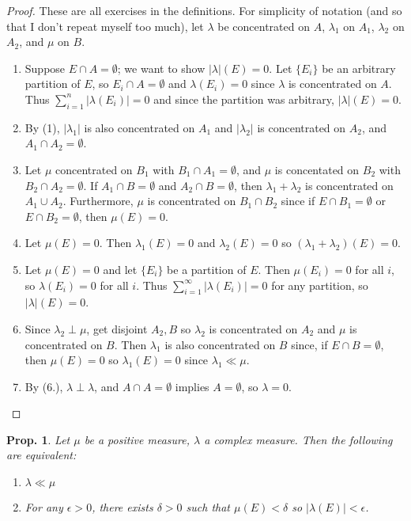 \documentclass[12pt, a4paper]{book}
\newtheorem{proposition}[theorem]{Prop.}
\theoremstyle{nonumberplain}
\newtheorem{proof}{Proof}
\begin{document}
\begin{proof}
    These are all exercises in the definitions.
    For simplicity of notation (and so that I don't repeat myself too much), let $\lambda$ be concentrated on $A$, $\lambda_1$ on $A_1$, $\lambda_2$ on $A_2$, and $\mu$ on $B$.
    \begin{enumerate}[nolistsep]
        \item Suppose $E\cap A=\emptyset$; we want to show $|\lambda|(E)=0$.
            Let $\{E_i\}$ be an arbitrary partition of $E$, so $E_i\cap A=\emptyset$ and $\lambda(E_i)=0$ since $\lambda$ is concentrated on $A$.
            Thus $\sum_{i=1}^n|\lambda(E_i)|=0$ and since the partition was arbitrary, $|\lambda|(E)=0$.
        \item By (1), $|\lambda_1|$ is also concentrated on $A_1$ and $|\lambda_2|$ is concentrated on $A_2$, and $A_1\cap A_2=\emptyset$.
        \item Let $\mu$ concentrated on $B_1$ with $B_1\cap A_1=\emptyset$, and $\mu$ is concentated on $B_2$ with $B_2\cap A_2=\emptyset$.
            If $A_1\cap B=\emptyset$ and $A_2\cap B=\emptyset$, then $\lambda_1+\lambda_2$ is concentrated on $A_1\cup A_2$.
            Furthermore, $\mu$ is concentrated on $B_1\cap B_2$ since if $E\cap B_1=\emptyset$ or $E\cap B_2=\emptyset$, then $\mu(E)=0$.
        \item Let $\mu(E)=0$.
            Then $\lambda_1(E)=0$ and $\lambda_2(E)=0$ so $(\lambda_1+\lambda_2)(E)=0$.
        \item Let $\mu(E)=0$ and let $\{E_i\}$ be a partition of $E$.
            Then $\mu(E_i)=0$ for all $i$, so $\lambda(E_i)=0$ for all $i$.
            Thus  $\sum_{i=1}^\infty|\lambda(E_i)|=0$ for any partition, so $|\lambda|(E)=0$.
        \item Since $\lambda_2\perp\mu$, get disjoint $A_2,B$ so $\lambda_2$ is concentrated on $A_2$ and $\mu$ is concentrated on $B$.
            Then $\lambda_1$ is also concentrated on $B$ since, if $E\cap B=\emptyset$, then $\mu(E)=0$ so $\lambda_1(E)=0$ since $\lambda_1\ll\mu$.
        \item By (6.), $\lambda\perp\lambda$, and $A\cap A=\emptyset$ implies $A=\emptyset$, so $\lambda=0$.
    \end{enumerate}
\end{proof}
\begin{proposition}
    Let $\mu$ be a positive measure, $\lambda$ a complex measure.
    Then the following are equivalent:
    \begin{enumerate}[nolistsep]
        \item $\lambda\ll\mu$
        \item For any $\epsilon>0$, there exists $\delta>0$ such that $\mu(E)<\delta$ so $|\lambda(E)|<\epsilon$.
    \end{enumerate}
\end{proposition}
\end{document}
